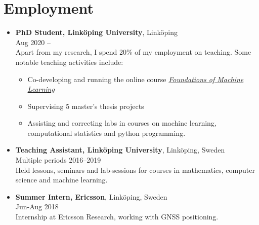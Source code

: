 \documentclass[12pt]{article}
\begin{document}
\section*{Employment}
\begin{itemize}
    \item \textbf{PhD Student, Linköping University}, Linköping\\
    Aug 2020 --\\
    Apart from my research, I spend 20\% of my employment on teaching. Some notable teaching activities include:
        \begin{itemize}
            \item Co-developing and running the online course \href{https://foundations-of-ml.ida.liu.se/}{\textit{Foundations of Machine Learning}}
            \item Supervising 5 master's thesis projects
            \item Assisting and correcting labs in courses on machine learning, computational statistics and python programming.
        \end{itemize}
    \item \textbf{Teaching Assistant, Linköping University}, Linköping, Sweden\\
        Multiple periods 2016--2019\\
            Held lessons, seminars and lab-sessions for courses in mathematics, computer science and machine learning.
    \item \textbf{Summer Intern, Ericsson}, Linköping, Sweden\\
        Jun-Aug 2018\\
        Internship at Ericsson Research, working with GNSS positioning.

\end{itemize}
\end{document}

